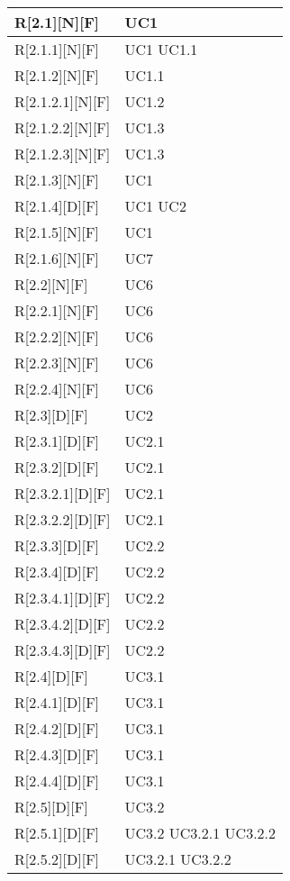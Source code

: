\begin{longtable}{X | X}
\hline
R[2.1][N][F] & UC1 \\
\hline
R[2.1.1][N][F] & UC1 \newline UC1.1 \\
\hline
R[2.1.2][N][F] & UC1.1 \\
\hline
R[2.1.2.1][N][F] & UC1.2 \\
\hline
R[2.1.2.2][N][F] & UC1.3 \\
\hline
R[2.1.2.3][N][F] & UC1.3 \\
\hline
R[2.1.3][N][F] & UC1 \\
\hline
R[2.1.4][D][F] & UC1 \newline UC2 \\
\hline
R[2.1.5][N][F] & UC1 \\
\hline
R[2.1.6][N][F] & UC7 \\
\hline
R[2.2][N][F] & UC6 \\
\hline
R[2.2.1][N][F] & UC6 \\
\hline
R[2.2.2][N][F] & UC6 \\
\hline
R[2.2.3][N][F] & UC6 \\
\hline
R[2.2.4][N][F] & UC6 \\
\hline
R[2.3][D][F] & UC2 \\
\hline
R[2.3.1][D][F] & UC2.1 \\
\hline
R[2.3.2][D][F] & UC2.1 \\
\hline
R[2.3.2.1][D][F] & UC2.1 \\
\hline
R[2.3.2.2][D][F] & UC2.1 \\
\hline
R[2.3.3][D][F] & UC2.2 \\
\hline
R[2.3.4][D][F] & UC2.2 \\
\hline
R[2.3.4.1][D][F] & UC2.2 \\
\hline
R[2.3.4.2][D][F] & UC2.2 \\
\hline
R[2.3.4.3][D][F] & UC2.2 \\
\hline
R[2.4][D][F] & UC3.1 \\
\hline
R[2.4.1][D][F] & UC3.1 \\
\hline
R[2.4.2][D][F] & UC3.1 \\
\hline
R[2.4.3][D][F] & UC3.1 \\
\hline
R[2.4.4][D][F] & UC3.1 \\
\hline
R[2.5][D][F] & UC3.2 \\
\hline
R[2.5.1][D][F] & UC3.2 \newline UC3.2.1 \newline UC3.2.2 \\
\hline
R[2.5.2][D][F] & UC3.2.1 \newline UC3.2.2 \\

\end{longtable}
